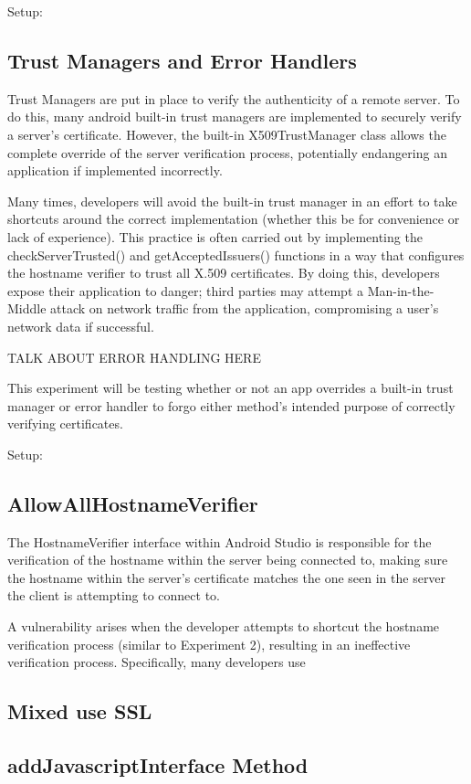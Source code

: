         Setup:

    \subsection{Trust Managers and Error Handlers}

        Trust Managers are put in place to verify the authenticity of a 
        remote server. To do this, many android built-in trust managers 
        are implemented to securely verify a server's certificate.
        However, the built-in X509TrustManager class allows the complete 
        override of the server verification process, potentially endangering
        an application if implemented incorrectly.

        Many times, developers will avoid the built-in trust manager in an
        effort to take shortcuts around the correct implementation (whether
        this be for convenience or lack of experience). This practice is often
        carried out by implementing the checkServerTrusted() and getAcceptedIssuers() 
        functions in a way that configures the hostname verifier to trust all X.509
        certificates. By doing this, developers expose their application to danger; 
        third parties may attempt a Man-in-the-Middle attack on network traffic
        from the application, compromising a user's network data if successful.

        TALK ABOUT ERROR HANDLING HERE

        This experiment will be testing whether or not an app overrides a built-in
        trust manager or error handler to forgo either method's intended purpose of
        correctly verifying certificates.

        Setup:

    \subsection{AllowAllHostnameVerifier}
    
        The HostnameVerifier interface within Android Studio is responsible for the 
        verification of the hostname within the server being connected to, making sure the hostname within
        the server's certificate matches the one seen in the server the client is attempting
        to connect to. 

        A vulnerability arises when the developer attempts to shortcut the hostname verification
        process (similar to Experiment 2), resulting in an ineffective verification process.
        Specifically, many developers use 

    \subsection{Mixed use SSL}

    \subsection{addJavascriptInterface Method}
